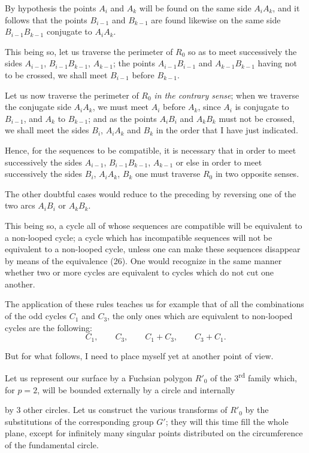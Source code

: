 \documentclass{article}
\begin{document}
By hypothesis the points $A_{i}$ and $A_{k}$ will be found on the same side $A_{i}A_{k}$, and it follows that the points $B_{i-1}$ and $B_{k-1}$ are found likewise on the same side $B_{i-1}B_{k-1}$ conjugate to $A_{i}A_{k}$.

This being so, let us traverse the perimeter of $R_{0}$ so as to meet successively the sides $A_{i-1}$, $B_{i-1}B_{k-1}$, $A_{k-1}$; the points $A_{i-1}B_{i-1}$ and $A_{k-1}B_{k-1}$ having not to be crossed, we shall meet $B_{i-1}$ before $B_{k-1}$.

Let us now traverse the perimeter of $R_{0}$ \emph{in the contrary sense}; when we traverse the conjugate side $A_{i}A_{k}$, we must meet $A_{i}$ before $A_{k}$, since $A_{i}$ is conjugate to $B_{i-1}$, and $A_{k}$ to $B_{k-1}$; and as the points $A_{i}B_{i}$ and $A_{k}B_{k}$ must not be crossed, we shall meet the sides $B_{i}$, $A_{i}A_{k}$ and $B_{k}$ in the order that I have just indicated.

Hence, for the sequences to be compatible, it is necessary that in order to meet successively the sides $A_{i-1}$, $B_{i-1}B_{k-1}$, $A_{k-1}$ or else in order to meet successively the sides $B_{i}$, $A_{i}A_{k}$, $B_{k}$ one must traverse $R_{0}$ in two opposite senses.

The other doubtful cases would reduce to the preceding by reversing one of the two arcs $A_{i}B_{i}$ or $A_{k}B_{k}$.

This being so, a cycle all of whose sequences are compatible will be equivalent to a non-looped cycle; a cycle which has incompatible sequences will not be equivalent to a non-looped cycle, unless one can make these sequences disappear by means of the equivalence (26). One would recognize in the same manner whether two or more cycles are equivalent to cycles which do not cut one another.

The application of these rules teaches us for example that of all the combinations of the odd cycles $C_{1}$ and $C_{3}$, the only ones which are equivalent to non-looped cycles are the following:
\[ C_{1}, \qquad C_{3}, \qquad C_{1} + C_{3}, \qquad C_{3} + C_{1}. \]

But for what follows, I need to place myself yet at another point of view.

Let us represent our surface by a Fuchsian polygon $R'_{0}$ of the 3\textsuperscript{rd} family which, for $p = 2$, will be bounded externally by a circle and internally

by 3 other circles. Let us construct the various transforms of $R'_{0}$ by the substitutions of the corresponding group $G'$; they will this time fill the whole plane, except for infinitely many singular points distributed on the circumference of the fundamental circle.
\end{document}
